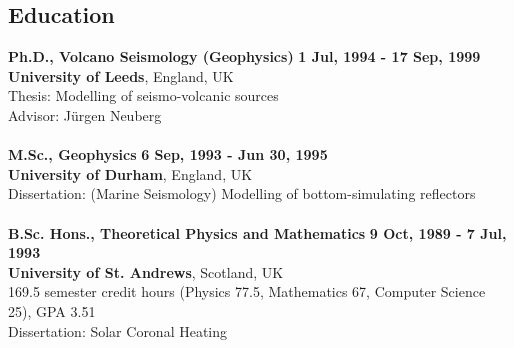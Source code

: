 \documentclass[margin,line]{res}
\begin{document}
\begin{resume}
\section{\sc Education}
{\bf Ph.D., Volcano Seismology (Geophysics)} \hfill {\bf 1 Jul, 1994 - 17 Sep, 1999} \\
{\bf University of Leeds}, England, UK\\
Thesis:  Modelling of seismo-volcanic sources \\
Advisor: J{\"u}rgen Neuberg \\
\\
{\bf M.Sc., Geophysics} \hfill {\bf 6 Sep, 1993 - Jun 30, 1995}\\
{\bf University of Durham}, England, UK\\
Dissertation: (Marine Seismology) Modelling of bottom-simulating reflectors\\
\\
{\bf B.Sc. Hons., Theoretical Physics and Mathematics} \hfill {\bf 9 Oct, 1989 - 7 Jul, 1993}\\
{\bf University of St. Andrews}, Scotland, UK\\
169.5 semester credit hours (Physics 77.5, Mathematics 67, Computer Science 25), GPA 3.51\\
Dissertation: Solar Coronal Heating\\
\\
\begin{comment}
{\bf A Levels} \hfill Aug 1987 - Jun 1989\\
Rawlins Academy, England, UK\\
Mathematics (A),
Physics (A),
Computer Science (B)
GPA 3.67, equivalent to High School Diploma + 40 undergraduate credits.\\
\\
{\bf O Levels} \hfill Aug 1985 - Jun 1987\\
Rawlins Academy, England, UK\\
Mathematics (A),
Physics (A),
Computer Studies (A),
Chemistry (B),
Humanities (B),
English Literature (B),
English Language (C),
Technical Graphics (C)
\\
\end{comment}
\hline

\end{resume}
\end{document}
